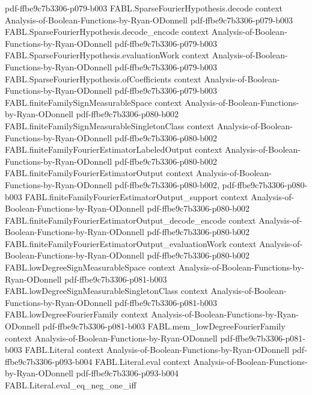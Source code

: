 \begin{theorem}
  {pdf-ffbe9c7b3306-p079-b003}
\proofstep
  {FABL.SparseFourierHypothesis.decode}
  {context}
  {Analysis-of-Boolean-Functions-by-Ryan-ODonnell}
  {pdf-ffbe9c7b3306-p079-b003}
\proofstep
  {FABL.SparseFourierHypothesis.decode_encode}
  {context}
  {Analysis-of-Boolean-Functions-by-Ryan-ODonnell}
  {pdf-ffbe9c7b3306-p079-b003}
\proofstep
  {FABL.SparseFourierHypothesis.evaluationWork}
  {context}
  {Analysis-of-Boolean-Functions-by-Ryan-ODonnell}
  {pdf-ffbe9c7b3306-p079-b003}
\proofstep
  {FABL.SparseFourierHypothesis.ofCoefficients}
  {context}
  {Analysis-of-Boolean-Functions-by-Ryan-ODonnell}
  {pdf-ffbe9c7b3306-p079-b003}
\proofstep
  {FABL.finiteFamilySignMeasurableSpace}
  {context}
  {Analysis-of-Boolean-Functions-by-Ryan-ODonnell}
  {pdf-ffbe9c7b3306-p080-b002}
\proofstep
  {FABL.finiteFamilySignMeasurableSingletonClass}
  {context}
  {Analysis-of-Boolean-Functions-by-Ryan-ODonnell}
  {pdf-ffbe9c7b3306-p080-b002}
\proofstep
  {FABL.finiteFamilyFourierEstimatorLabeledOutput}
  {context}
  {Analysis-of-Boolean-Functions-by-Ryan-ODonnell}
  {pdf-ffbe9c7b3306-p080-b002}
\proofstep
  {FABL.finiteFamilyFourierEstimatorOutput}
  {context}
  {Analysis-of-Boolean-Functions-by-Ryan-ODonnell}
  {pdf-ffbe9c7b3306-p080-b002,
    pdf-ffbe9c7b3306-p080-b003}
\proofstep
  {FABL.finiteFamilyFourierEstimatorOutput_support}
  {context}
  {Analysis-of-Boolean-Functions-by-Ryan-ODonnell}
  {pdf-ffbe9c7b3306-p080-b002}
\proofstep
  {FABL.finiteFamilyFourierEstimatorOutput_decode_encode}
  {context}
  {Analysis-of-Boolean-Functions-by-Ryan-ODonnell}
  {pdf-ffbe9c7b3306-p080-b002}
\proofstep
  {FABL.finiteFamilyFourierEstimatorOutput_evaluationWork}
  {context}
  {Analysis-of-Boolean-Functions-by-Ryan-ODonnell}
  {pdf-ffbe9c7b3306-p080-b002}
\proofstep
  {FABL.lowDegreeSignMeasurableSpace}
  {context}
  {Analysis-of-Boolean-Functions-by-Ryan-ODonnell}
  {pdf-ffbe9c7b3306-p081-b003}
\proofstep
  {FABL.lowDegreeSignMeasurableSingletonClass}
  {context}
  {Analysis-of-Boolean-Functions-by-Ryan-ODonnell}
  {pdf-ffbe9c7b3306-p081-b003}
\proofstep
  {FABL.lowDegreeFourierFamily}
  {context}
  {Analysis-of-Boolean-Functions-by-Ryan-ODonnell}
  {pdf-ffbe9c7b3306-p081-b003}
\proofstep
  {FABL.mem_lowDegreeFourierFamily}
  {context}
  {Analysis-of-Boolean-Functions-by-Ryan-ODonnell}
  {pdf-ffbe9c7b3306-p081-b003}
\proofstep
  {FABL.Literal}
  {context}
  {Analysis-of-Boolean-Functions-by-Ryan-ODonnell}
  {pdf-ffbe9c7b3306-p093-b004}
\proofstep
  {FABL.Literal.eval}
  {context}
  {Analysis-of-Boolean-Functions-by-Ryan-ODonnell}
  {pdf-ffbe9c7b3306-p093-b004}
\proofstep
  {FABL.Literal.eval_eq_neg_one_iff}

\end{theorem}
